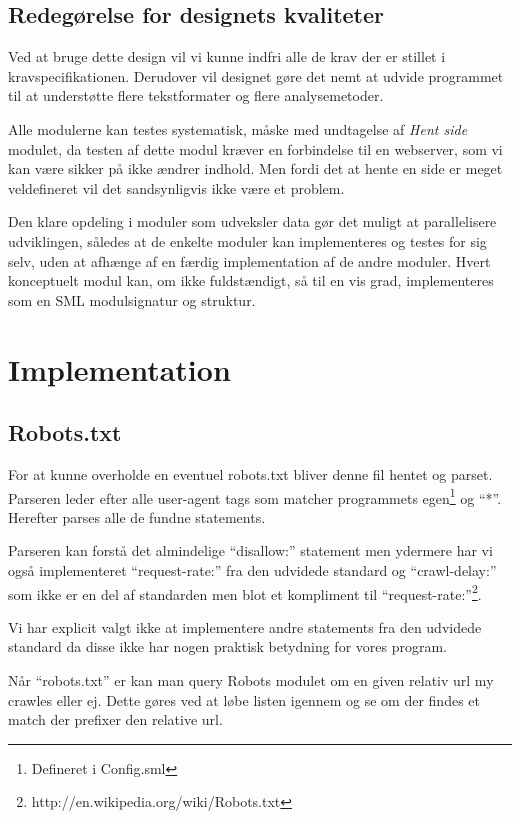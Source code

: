 \documentclass[a4paper,oneside,article]{memoir}
\begin{document}
\section{Redegørelse for designets kvaliteter}
Ved at bruge dette design vil vi kunne indfri alle de krav der er
stillet i kravspecifikationen. Derudover vil designet gøre det nemt at
udvide programmet til at understøtte flere tekstformater og flere
analysemetoder.

Alle modulerne kan testes systematisk, måske med undtagelse af
\textit{Hent side} modulet, da testen af dette modul kræver en
forbindelse til en webserver, som vi kan være sikker på ikke ændrer
indhold. Men fordi det at hente en side er meget veldefineret vil det
sandsynligvis ikke være et problem.

Den klare opdeling i moduler som udveksler data gør det muligt at
parallelisere udviklingen, således at de enkelte moduler kan
implementeres og testes for sig selv, uden at afhænge af en færdig
implementation af de andre moduler. Hvert konceptuelt modul kan, om
ikke fuldstændigt, så til en vis grad, implementeres som en SML
modulsignatur og struktur.

\chapter{Implementation}

\section{Robots.txt}

For at kunne overholde en eventuel robots.txt bliver denne fil hentet
og parset.  Parseren leder efter alle user-agent tags som matcher
programmets egen\footnote{Defineret i Config.sml} og ``*''. Herefter
parses alle de fundne statements.

Parseren kan forstå det almindelige ``disallow:'' statement men
ydermere har vi også implementeret ``request-rate:'' fra den udvidede
standard og ``crawl-delay:'' som ikke er en del af standarden men blot
et kompliment til
``request-rate:''\footnote{http://en.wikipedia.org/wiki/Robots.txt}.

Vi har explicit valgt ikke at implementere andre statements fra den
udvidede standard da disse ikke har nogen praktisk betydning for vores
program.

Når ``robots.txt'' er kan man query Robots modulet om en given relativ
url my crawles eller ej. Dette gøres ved at løbe listen igennem og se
om der findes et match der prefixer den relative url.
\end{document}

